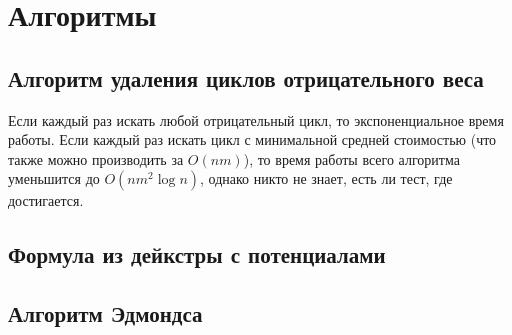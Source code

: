 \documentclass[14pt,a4paper,oneside]{article}
\begin{document}
\section{Алгоритмы}

%

%

%

%

\subsection{Алгоритм удаления циклов отрицательного веса}
Если каждый раз искать любой отрицательный цикл, то экспоненциальное время работы. Если каждый раз искать цикл с минимальной средней стоимостью (что также можно производить за $O(nm)$), то время работы всего алгоритма уменьшится до $O(nm^2 \log n)$, однако никто не знает, есть ли тест, где достигается.

\subsection{Формула из дейкстры с потенциалами}


 
\subsection{Алгоритм Эдмондса}


%
\end{document}

